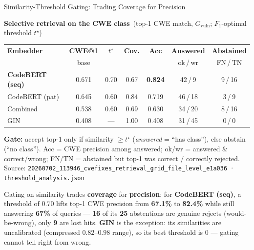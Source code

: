 \documentclass[aspectratio=169,10pt]{beamer}
\newcommand{\chit}[1]{\cellcolor{hit!30} #1}
\newcommand{\cmiss}[1]{\cellcolor{miss!25} #1}
\newcommand{\cwarn}[1]{\cellcolor{warn!30} #1}
\begin{document}
\begin{frame}{Similarity-Threshold Gating: Trading Coverage for Precision}

  \begin{center}
    {\small\textbf{Selective retrieval on the CWE class}\ {\scriptsize(top-1 CWE match, $G_{\mathrm{vuln}}$; $F_1$-optimal threshold $t^\star$)}}\\[4pt]
  {\scriptsize
  \renewcommand{\arraystretch}{1.3}
  \setlength{\tabcolsep}{4.5pt}
    \begin{tabular}{lcccccc}
      \toprule
      \textbf{Embedder} & \textbf{CWE@1} & \textbf{$t^\star$} & \textbf{Cov.} & \textbf{Acc} & \textbf{Answered} & \textbf{Abstained} \\
       & {\tiny base} & & & & {\tiny ok\,/\,wr} & {\tiny FN\,/\,TN} \\
      \midrule
      \rowcolor{hit!12}
      \textbf{CodeBERT (seq)} & 0.671 & 0.70 & 0.67 & \chit{\textbf{0.824}} & 42\,/\,9 & 9\,/\,16 \\
      CodeBERT (pat) & 0.645 & 0.60 & 0.84 & \cwarn{0.719} & 46\,/\,18 & 3\,/\,9 \\
      Combined & 0.538 & 0.60 & 0.69 & \cwarn{0.630} & 34\,/\,20 & 8\,/\,16 \\
      GIN & 0.408 & --- & 1.00 & \cmiss{0.408} & 31\,/\,45 & 0\,/\,0 \\
      \bottomrule
    \end{tabular}}

  \vspace{0.25em}
  {\tiny\textcolor{notecol}{\textbf{Gate:} accept top-1 only if similarity $\geq t^\star$ (\emph{answered} = ``has class''), else abstain (``no class''). Acc = CWE precision among answered; ok/wr = answered \& correct/wrong; FN/TN = abstained but top-1 was correct / correctly rejected.}}\\[2pt]
  {\tiny\textcolor{notecol}{Source: \texttt{20260702\_113946\_cvefixes\_retrieval\_grid\_file\_level\_e1a036} · \texttt{threshold\_analysis.json}}}
  \end{center}

  \vspace{0.3em}
  \begin{tcolorbox}[colback=hit!5, colframe=hit!70!black, boxrule=0.35pt,
    left=3pt, right=3pt, top=2pt, bottom=1pt, arc=2pt, width=\linewidth]
    \scriptsize
    Gating on similarity trades \textbf{coverage} for \textbf{precision}: for \textbf{CodeBERT (seq)}, a threshold of $0.70$ lifts top-1 CWE precision from \textbf{67.1\%} to \textbf{82.4\%} while still answering \textbf{67\%} of queries --- \textbf{16} of its \textbf{25} abstentions are genuine rejects (would-be-wrong), only \textbf{9} are lost hits. \textbf{GIN} is the exception: its similarities are uncalibrated (compressed $0.82$--$0.98$ range), so its best threshold is $0$ --- \textcolor{miss}{gating cannot tell right from wrong}.
  \end{tcolorbox}

\end{frame}
\end{document}
